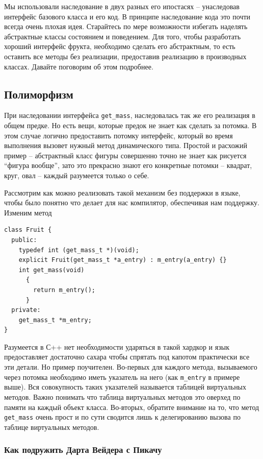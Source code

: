 \documentclass[a4paper,12pt,oneside]{article}
\begin{document}
Мы использовали наследование в двух разных его ипостасях – унаследовав интерфейс базового класса и его код. В принципе наследование кода это почти всегда очень плохая идея. Старайтесь по мере возможности избегать наделять абстрактные классы состоянием и поведением. Для того, чтобы разработать хороший интерфейс фрукта, необходимо сделать его абстрактным, то есть оставить все методы без реализации, предоставив реализацию в производных классах. Давайте поговорим об этом подробнее.

\subsection{Полиморфизм}

При наследовании интерфейса \lstinline!get_mass!, наследовалась так же его реализация в общем предке. Но есть вещи, которые предок не знает как сделать за потомка. В этом случае логично предоставить потомку интерфейс, который во время выполнения вызовет нужный метод динамического типа. Простой и расхожий пример -- абстрактный класс фигуры совершенно точно не знает как рисуется ``фигура вообще'', зато это прекрасно знают его конкретные потомки -- квадрат, круг, овал -- каждый разумеется только о себе.

Рассмотрим как можно реализовать такой механизм без поддержки в языке, чтобы было понятно что делает для нас компилятор, обеспечивая нам поддержку. Изменим метод 

\begin{lstlisting}
class Fruit {
  public:
    typedef int (get_mass_t *)(void);
    explicit Fruit(get_mass_t *a_entry) : m_entry(a_entry) {}
    int get_mass(void)
      { 
        return m_entry();
      }
  private:
    get_mass_t *m_entry;
}
\end{lstlisting}

Разумеется в С++ нет необходимости ударяться в такой хардкор и язык предоставляет достаточно сахара чтобы спрятать под капотом практически все эти детали. Но пример поучителен. Во-первых для каждого метода, вызываемого через потомка необходимо иметь указатель на него (как \lstinline!m_entry! в примере выше). Вся совокупность таких указателей называется таблицей виртуальных методов. Важно понимать что таблица виртуальных методов это оверхед по памяти на каждый объект класса. Во-вторых, обратите внимание на то, что метод \lstinline!get_mass! очень прост и по сути сводится лишь к делегированию вызова по таблице виртуальных методов.

\subsubsection{Как подружить Дарта Вейдера с Пикачу}
\end{document}
